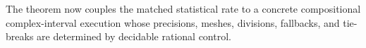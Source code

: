 The theorem now couples the matched statistical rate to a concrete compositional complex-interval execution whose precisions, meshes, divisions, fallbacks, and tie-breaks are determined by decidable rational control.